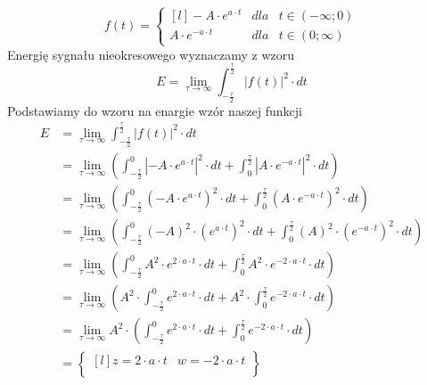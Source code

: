 \begin{task}
\begin{equation}
f(t) = \left\{\begin{matrix*}[l]
-A \cdot e^{a\cdot t} & dla & t \in \left(-\infty; 0\right)\\
A \cdot e^{-a\cdot t} & dla & t \in \left(0; \infty\right)
\end{matrix*}\right.
\end{equation}
Energię sygnału nieokresowego wyznaczamy z wzoru
\begin{equation}
E=\lim_{\tau \rightarrow \infty}\int_{-\frac{\tau}{2}}^{\frac{\tau}{2}}\left|f(t)\right|^2 \cdot dt
\end{equation}
Podstawiamy do wzoru na enargie wzór naszej funkcji
\begin{align*}
E&=\lim_{\tau \rightarrow \infty}\int_{-\frac{\tau}{2}}^{\frac{\tau}{2}}\left|f(t)\right|^2 \cdot dt\\
 &=\lim_{\tau \rightarrow \infty} \left( 
   \int_{-\frac{\tau}{2}}^{0}\left| -A \cdot e^{a\cdot t} \right|^2 \cdot dt 
 + \int_{0}^{\frac{\tau}{2}}\left| A \cdot e^{-a\cdot t} \right|^2 \cdot dt \right)\\
 &=\lim_{\tau \rightarrow \infty} \left( 
   \int_{-\frac{\tau}{2}}^{0}\left( -A \cdot e^{a\cdot t} \right)^2 \cdot dt 
 + \int_{0}^{\frac{\tau}{2}}\left( A \cdot e^{-a\cdot t} \right)^2 \cdot dt \right)\\
 &=\lim_{\tau \rightarrow \infty} \left( 
   \int_{-\frac{\tau}{2}}^{0}\left( -A\right)^2 \cdot \left(e^{a\cdot t} \right)^2 \cdot dt 
 + \int_{0}^{\frac{\tau}{2}}\left( A \right)^2 \cdot \left(e^{-a\cdot t} \right)^2 \cdot dt \right)\\
 &=\lim_{\tau \rightarrow \infty} \left( 
   \int_{-\frac{\tau}{2}}^{0} A^2 \cdot e^{2\cdot a\cdot t} \cdot dt 
 + \int_{0}^{\frac{\tau}{2}} A^2 \cdot e^{-2 \cdot a\cdot t} \cdot dt \right)\\
 &=\lim_{\tau \rightarrow \infty} \left( 
    A^2 \cdot \int_{-\frac{\tau}{2}}^{0}  e^{2\cdot a\cdot t} \cdot dt 
 +  A^2 \cdot \int_{0}^{\frac{\tau}{2}} e^{-2 \cdot a\cdot t} \cdot dt \right)\\
 &=\lim_{\tau \rightarrow \infty} A^2 \cdot \left( 
   \int_{-\frac{\tau}{2}}^{0}  e^{2\cdot a\cdot t} \cdot dt 
 + \int_{0}^{\frac{\tau}{2}} e^{-2 \cdot a\cdot t} \cdot dt \right)\\
 &=\begin{Bmatrix*}[l]
   z=2\cdot a \cdot t & w=-2 \cdot a \cdot t\\

\end{Bmatrix*}
\end{align*}
\end{task}

